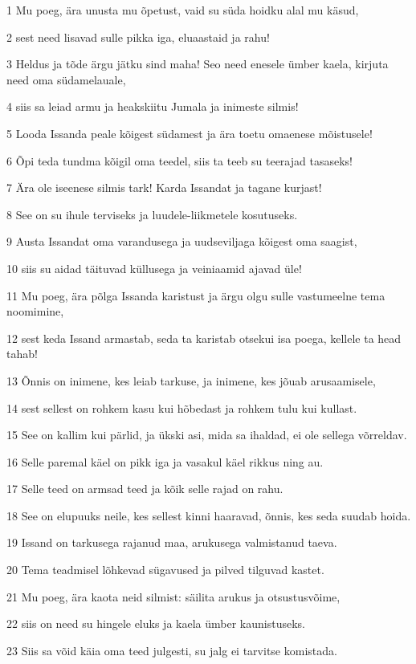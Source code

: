 \par 1 Mu poeg, ära unusta mu õpetust, vaid su süda hoidku alal mu käsud,
\par 2 sest need lisavad sulle pikka iga, eluaastaid ja rahu!
\par 3 Heldus ja tõde ärgu jätku sind maha! Seo need enesele ümber kaela, kirjuta need oma südamelauale,
\par 4 siis sa leiad armu ja heakskiitu Jumala ja inimeste silmis!
\par 5 Looda Issanda peale kõigest südamest ja ära toetu omaenese mõistusele!
\par 6 Õpi teda tundma kõigil oma teedel, siis ta teeb su teerajad tasaseks!
\par 7 Ära ole iseenese silmis tark! Karda Issandat ja tagane kurjast!
\par 8 See on su ihule terviseks ja luudele-liikmetele kosutuseks.
\par 9 Austa Issandat oma varandusega ja uudseviljaga kõigest oma saagist,
\par 10 siis su aidad täituvad küllusega ja veiniaamid ajavad üle!
\par 11 Mu poeg, ära põlga Issanda karistust ja ärgu olgu sulle vastumeelne tema noomimine,
\par 12 sest keda Issand armastab, seda ta karistab otsekui isa poega, kellele ta head tahab!
\par 13 Õnnis on inimene, kes leiab tarkuse, ja inimene, kes jõuab arusaamisele,
\par 14 sest sellest on rohkem kasu kui hõbedast ja rohkem tulu kui kullast.
\par 15 See on kallim kui pärlid, ja ükski asi, mida sa ihaldad, ei ole sellega võrreldav.
\par 16 Selle paremal käel on pikk iga ja vasakul käel rikkus ning au.
\par 17 Selle teed on armsad teed ja kõik selle rajad on rahu.
\par 18 See on elupuuks neile, kes sellest kinni haaravad, õnnis, kes seda suudab hoida.
\par 19 Issand on tarkusega rajanud maa, arukusega valmistanud taeva.
\par 20 Tema teadmisel lõhkevad sügavused ja pilved tilguvad kastet.
\par 21 Mu poeg, ära kaota neid silmist: säilita arukus ja otsustusvõime,
\par 22 siis on need su hingele eluks ja kaela ümber kaunistuseks.
\par 23 Siis sa võid käia oma teed julgesti, su jalg ei tarvitse komistada.
